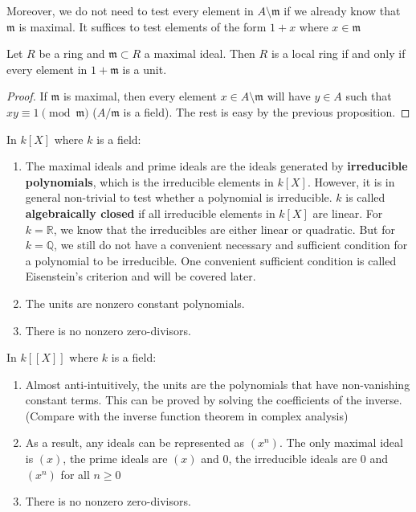 \documentclass{note-eng}
\begin{document}
Moreover, we do not need to test every element in $A \setminus \mathfrak{m}$ if we already know that $\mathfrak{m}$ is maximal. It suffices to test elements of the form $1 + x$ where $x \in \mathfrak{m}$

\begin{proposition}
    Let $R$ be a ring and $\mathfrak{m} \subset R$ a maximal ideal. Then $R$ is a local ring if and only if every element in $1 + \mathfrak{m}$ is a unit.
\end{proposition}

\begin{proof}
    If $\mathfrak{m}$ is maximal, then every element $x \in A \setminus \mathfrak{m}$ will have $y \in A$ such that $xy \equiv 1 \pmod {\mathfrak{m}}$ ($A / \mathfrak{m}$ is a field). The rest is easy by the previous proposition.
\end{proof}

\fi

\begin{example}
    In $k[X]$ where $k$ is a field:
    \begin{enumerate}
        \item The maximal ideals and prime ideals are the ideals generated by \textbf{irreducible polynomials}, which is the irreducible elements in $k[X]$. However, it is in general non-trivial to test whether a polynomial is irreducible. $k$ is called \textbf{algebraically closed} if all irreducible elements in $k[X]$ are linear. For $k = \mathbb{R}$, we know that the irreducibles are either linear or quadratic. But for $k = \mathbb{Q}$, we still do not have a convenient necessary and sufficient condition for a polynomial to be irreducible. One convenient sufficient condition is called Eisenstein's criterion and will be covered later.
        \item The units are nonzero constant polynomials.
        \item There is no nonzero zero-divisors.
    \end{enumerate}
\end{example}

\begin{example}
    In $k[[X]]$ where $k$ is a field:
    \begin{enumerate}
        \item Almost anti-intuitively, the units are the polynomials that have non-vanishing constant terms. This can be proved by solving the coefficients of the inverse. (Compare with the inverse function theorem in complex analysis)
        \item As a result, any ideals can be represented as $(x^n)$. The only maximal ideal is $(x)$, the prime ideals are $(x)$ and $0$, the irreducible ideals are $0$ and $(x^n)$ for all $n \ge 0$
        \item There is no nonzero zero-divisors.
    \end{enumerate}
\end{example}
\end{document}
